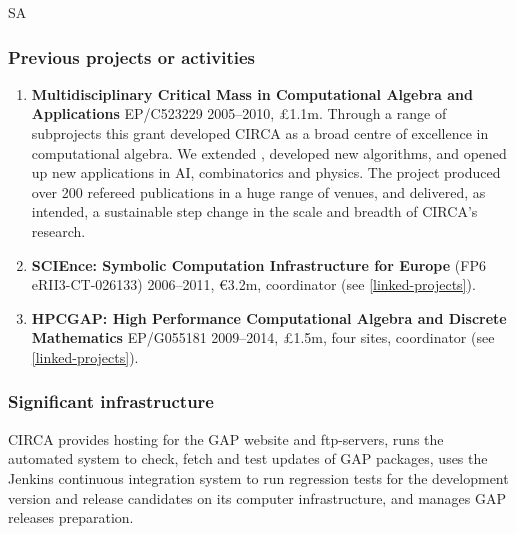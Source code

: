 \begin{sitedescription}{SA}
\begin{enumerate}
\end{enumerate}

\subsubsection*{Previous projects or activities}

\begin{enumerate}
\item
\textbf{Multidisciplinary Critical Mass in Computational
Algebra and Applications} EP/C523229 2005--2010, \pounds 1.1m.
Through a range of subprojects this grant developed CIRCA as 
a broad centre of excellence in computational algebra. We 
extended \GAP, developed new algorithms, and opened up new 
applications in AI, combinatorics and physics. The project 
produced over 200 refereed publications in a huge range of 
venues, and delivered, as intended, a sustainable step change 
in the scale and breadth of CIRCA's research.
\item 
\textbf{SCIEnce: Symbolic Computation Infrastructure for Europe}
(FP6 eRII3-CT-026133) 2006--2011, \euro 3.2m, coordinator
(see \ref{linked-projects}).
\item
\textbf{HPCGAP: High Performance Computational Algebra and Discrete Mathematics} 
EP/G055181 2009--2014, \pounds 1.5m, four sites, coordinator (see \ref{linked-projects}).
\end{enumerate}

\subsubsection*{Significant infrastructure}

CIRCA provides hosting for the GAP website and ftp-servers, runs the 
automated system to check, fetch and test updates of GAP packages, uses 
the Jenkins continuous integration system to run regression tests for the 
development version and release candidates on its computer infrastructure, 
and manages GAP releases preparation.
\end{sitedescription}


